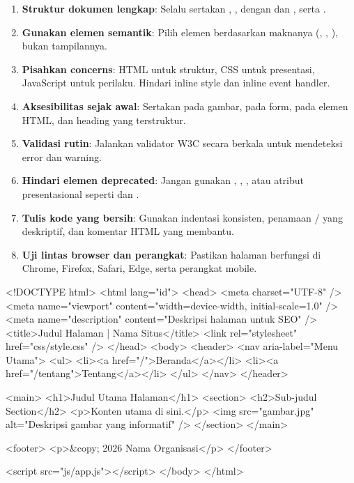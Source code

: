 \begin{enumerate}
  \item \textbf{Struktur dokumen lengkap}: Selalu sertakan , ,  dengan  dan , serta .
  \item \textbf{Gunakan elemen semantik}: Pilih elemen berdasarkan maknanya (, , ), bukan tampilannya.
  \item \textbf{Pisahkan concerns}: HTML untuk struktur, CSS untuk presentasi, JavaScript untuk perilaku. Hindari inline style dan inline event handler.
  \item \textbf{Aksesibilitas sejak awal}: Sertakan  pada gambar,  pada form,  pada elemen HTML, dan heading yang terstruktur.
  \item \textbf{Validasi rutin}: Jalankan validator W3C secara berkala untuk mendeteksi error dan warning.
  \item \textbf{Hindari elemen deprecated}: Jangan gunakan , , , atau atribut presentasional seperti  dan .
  \item \textbf{Tulis kode yang bersih}: Gunakan indentasi konsisten, penamaan / yang deskriptif, dan komentar HTML yang membantu.
  \item \textbf{Uji lintas browser dan perangkat}: Pastikan halaman berfungsi di Chrome, Firefox, Safari, Edge, serta perangkat mobile.
\end{enumerate}

\begin{webcode}[language=HTML, caption={Template HTML5 yang mengikuti best practices}]
<!DOCTYPE html>
<html lang="id">
<head>
  <meta charset="UTF-8" />
  <meta name="viewport"
    content="width=device-width, initial-scale=1.0" />
  <meta name="description"
    content="Deskripsi halaman untuk SEO" />
  <title>Judul Halaman | Nama Situs</title>
  <link rel="stylesheet" href="css/style.css" />
</head>
<body>
  <header>
    <nav aria-label="Menu Utama">
      <ul>
        <li><a href="/">Beranda</a></li>
        <li><a href="/tentang">Tentang</a></li>
      </ul>
    </nav>
  </header>

  <main>
    <h1>Judul Utama Halaman</h1>
    <section>
      <h2>Sub-judul Section</h2>
      <p>Konten utama di sini.</p>
      <img src="gambar.jpg"
           alt="Deskripsi gambar yang informatif" />
    </section>
  </main>

  <footer>
    <p>&copy; 2026 Nama Organisasi</p>
  </footer>

  <script src="js/app.js"></script>
</body>
</html>
\end{webcode}

